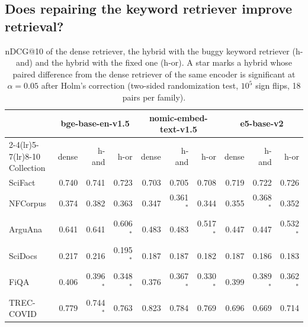 \documentclass[11pt]{article}
\begin{document}
\subsection{Does repairing the keyword retriever improve retrieval?}
\label{sec:effect}

\begin{table}[h]
\centering
\small
\begin{tabular}{lrrrrrrrrr}
\toprule
 & \multicolumn{3}{c}{bge-base-en-v1.5} & \multicolumn{3}{c}{nomic-embed-text-v1.5} & \multicolumn{3}{c}{e5-base-v2} \\
\cmidrule(lr){2-4}\cmidrule(lr){5-7}\cmidrule(lr){8-10}
Collection & dense & h-and & h-or & dense & h-and & h-or & dense & h-and & h-or \\
\midrule
SciFact & 0.740 & 0.741 & 0.723 & 0.703 & 0.705 & 0.708 & 0.719 & 0.722 & 0.726 \\
NFCorpus & 0.374 & 0.382 & 0.363 & 0.347 & 0.361$^{*}$ & 0.344 & 0.355 & 0.368$^{*}$ & 0.352 \\
ArguAna & 0.641 & 0.641 & 0.606$^{*}$ & 0.483 & 0.483 & 0.517$^{*}$ & 0.447 & 0.447 & 0.532$^{*}$ \\
SciDocs & 0.217 & 0.216 & 0.195$^{*}$ & 0.187 & 0.187 & 0.182 & 0.187 & 0.186 & 0.183 \\
FiQA & 0.406 & 0.396$^{*}$ & 0.348$^{*}$ & 0.376 & 0.367$^{*}$ & 0.330$^{*}$ & 0.399 & 0.389$^{*}$ & 0.362$^{*}$ \\
TREC-COVID & 0.779 & 0.744$^{*}$ & 0.763 & 0.823 & 0.784 & 0.769 & 0.696 & 0.669 & 0.714 \\
\bottomrule
\end{tabular}
\caption{nDCG@10 of the dense retriever, the hybrid with the buggy keyword retriever (h-and) and the hybrid with the fixed one (h-or). A star marks a hybrid whose paired difference from the dense retriever of the same encoder is significant at $\alpha = 0.05$ after Holm's correction (two-sided randomization test, $10^5$ sign flips, 18 pairs per family).}
\label{tab:ndcg}
\end{table}
\end{document}
